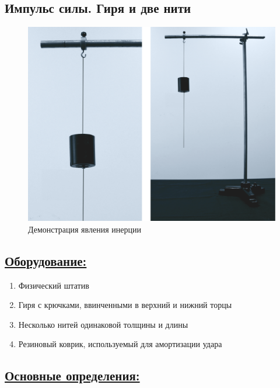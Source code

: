 \documentclass[14pt,a4paper,oneside]{extarticle}	%
\begin{document}

\begin{center}
	\subsection*{Импульс силы. Гиря и две нити}
\end{center}

\begin{figure}[H] 	%
	\centering 		%
	\includegraphics[width=0.9\linewidth]{inertia-2.png}
	\caption{Демонстрация явления инерции}
\end{figure}

\subsection*{\underline{Оборудование:}}

\begin{enumerate}
	\item Физический штатив
	\item Гиря с крючками, ввинченными в верхний и нижний торцы
	\item Несколько нитей одинаковой толщины и длины
	\item Резиновый коврик, используемый для амортизации удара
\end{enumerate}

\newpage
\subsection*{\underline{Основные определения:}}
\end{document}
